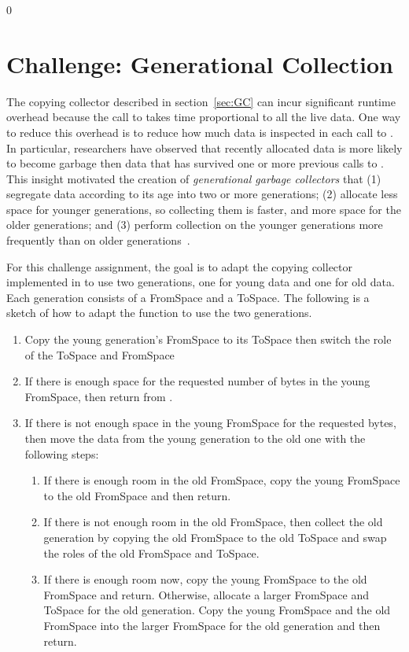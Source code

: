\documentclass[7x10]{TimesAPriori_MIT}%
\def\racketEd{0}
\def\edition{0}
\numberwithin{theorem}{chapter}
\numberwithin{definition}{chapter}
\numberwithin{equation}{chapter}
\begin{document}
{\if\edition\racketEd
\section{Challenge: Generational Collection}

The copying collector described in section~\ref{sec:GC} can incur
significant runtime overhead because the call to  takes
time proportional to all the live data. One way to reduce this
overhead is to reduce how much data is inspected in each call to
. In particular, researchers have observed that recently
allocated data is more likely to become garbage then data that has
survived one or more previous calls to . This insight
motivated the creation of \emph{generational garbage collectors}
 that
(1) segregate data according to its age into two or more generations;
(2) allocate less space for younger generations, so collecting them is
faster, and more space for the older generations; and (3) perform
collection on the younger generations more frequently than on older
generations~\citep{Wilson:1992fk}.

For this challenge assignment, the goal is to adapt the copying
collector implemented in  to use two generations, one
for young data and one for old data. Each generation consists of a
FromSpace and a ToSpace. The following is a sketch of how to adapt the
 function to use the two generations.

\begin{enumerate}
\item Copy the young generation's FromSpace to its ToSpace then switch
  the role of the ToSpace and FromSpace
\item If there is enough space for the requested number of bytes in
  the young FromSpace, then return from .
\item If there is not enough space in the young FromSpace for the
  requested bytes, then move the data from the young generation to the
  old one with the following steps:
  \begin{enumerate}
  \item If there is enough room in the old FromSpace, copy the young
    FromSpace to the old FromSpace and then return.
  \item If there is not enough room in the old FromSpace, then collect
    the old generation by copying the old FromSpace to the old ToSpace
    and swap the roles of the old FromSpace and ToSpace.
  \item If there is enough room now, copy the young FromSpace to the
    old FromSpace and return. Otherwise, allocate a larger FromSpace
    and ToSpace for the old generation.  Copy the young FromSpace and
    the old FromSpace into the larger FromSpace for the old
    generation and then return.
  \end{enumerate}
\end{enumerate}

}
\end{document}
